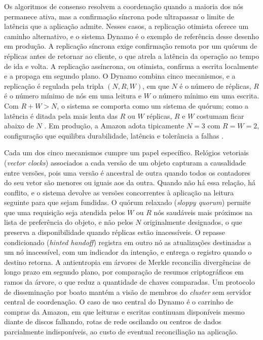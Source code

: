 Os algoritmos de consenso resolvem a coordenação quando a maioria dos nós permanece ativa, mas a confirmação síncrona pode ultrapassar o limite de latência que a aplicação admite. Nesses casos, a replicação otimista oferece um caminho alternativo, e o sistema Dynamo é o exemplo de referência desse desenho em produção. A replicação síncrona exige confirmação remota por um quórum de réplicas antes de retornar ao cliente, o que atrela a latência da operação ao tempo de ida e volta. A replicação assíncrona, ou otimista, confirma a escrita localmente e a propaga em segundo plano. O Dynamo combina cinco mecanismos, e a replicação é regulada pela tripla $(N, R, W)$, em que $N$ é o número de réplicas, $R$ é o número mínimo de nós em uma leitura e $W$ o número mínimo em uma escrita. Com $R + W > N$, o sistema se comporta como um sistema de quórum; como a latência é ditada pela mais lenta das $R$ ou $W$ réplicas, $R$ e $W$ costumam ficar abaixo de $N$ \citep[seção 4.5]{decandia_dynamo_2007}. Em produção, a Amazon adota tipicamente $N = 3$ com $R = W = 2$, configuração que equilibra durabilidade, latência e tolerância a falhas \citep[seção 6]{decandia_dynamo_2007}.

Cada um dos cinco mecanismos cumpre um papel específico. Relógios vetoriais (\emph{vector clocks}) associados a cada versão de um objeto capturam a causalidade entre versões, pois uma versão é ancestral de outra quando todos os contadores do seu vetor são menores ou iguais aos da outra. Quando não há essa relação, há conflito, e o sistema devolve as versões concorrentes à aplicação na leitura seguinte para que sejam fundidas. O quórum relaxado (\emph{sloppy quorum}) permite que uma requisição seja atendida pelos $W$ ou $R$ nós saudáveis mais próximos na lista de preferência do objeto, e não pelos $N$ originalmente designados, o que preserva a disponibilidade quando réplicas estão inacessíveis. O repasse condicionado (\emph{hinted handoff}) registra em outro nó as atualizações destinadas a um nó inacessível, com um indicador da intenção, e entrega o registro quando o destino retorna. A antientropia em árvores de Merkle reconcilia divergências de longo prazo em segundo plano, por comparação de resumos criptográficos em ramos da árvore, o que reduz a quantidade de chaves comparadas. Um protocolo de disseminação por boato mantém a visão de membros do \emph{cluster} sem servidor central de coordenação. O caso de uso central do Dynamo é o carrinho de compras da Amazon, em que leituras e escritas continuam disponíveis mesmo diante de discos falhando, rotas de rede oscilando ou centros de dados parcialmente indisponíveis, ao custo de eventual reconciliação na aplicação.

